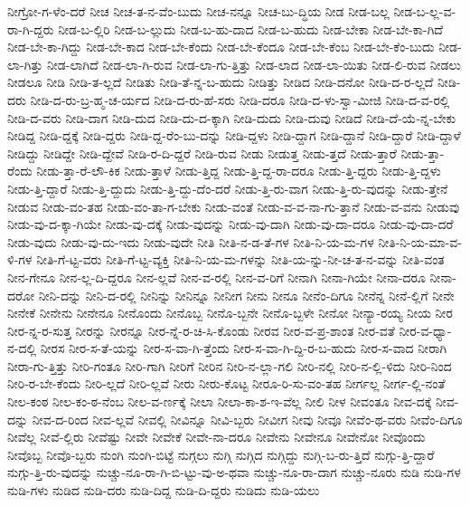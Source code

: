 {ನೀಗ್ರೋ-ಗ-ಳೆಂ-ದರೆ
ನೀಚ
ನೀಚ-ತ-ನ-ವೆಂ-ಬುದು
ನೀಚ-ನನ್ನೂ
ನೀಚ-ಬು-ದ್ಧಿಯ
ನೀಡ
ನೀಡ-ಬಲ್ಲ
ನೀಡ-ಬ-ಲ್ಲ-ವ-ರಾ-ಗಿ-ದ್ದರು
ನೀಡ-ಬ-ಲ್ಲಿರಿ
ನೀಡ-ಬ-ಲ್ಲುದು
ನೀಡ-ಬ-ಹು-ದಾದ
ನೀಡ-ಬ-ಹುದು
ನೀಡ-ಬೇಕಾ
ನೀಡ-ಬೇ-ಕಾ-ಗಿದೆ
ನೀಡ-ಬೇ-ಕಾ-ಗಿದ್ದು
ನೀಡ-ಬೇ-ಕಾದ
ನೀಡ-ಬೇ-ಕೆಂದು
ನೀಡ-ಬೇ-ಕೆಂದೂ
ನೀಡ-ಬೇ-ಕೆಂಬ
ನೀಡ-ಬೇ-ಕೆಂ-ಬುದು
ನೀಡ-ಲಾ-ಗಿತ್ತು
ನೀಡ-ಲಾಗಿದೆ
ನೀಡ-ಲಾ-ಗಿ-ರುವ
ನೀಡ-ಲಾ-ಗು-ತ್ತಿತ್ತು
ನೀಡ-ಲಾದ
ನೀಡ-ಲಾ-ಯಿತು
ನೀಡ-ಲಿ-ರುವ
ನೀಡಲು
ನೀಡಲೂ
ನೀಡಿ
ನೀಡಿ-ತ-ಲ್ಲದೆ
ನೀಡಿತು
ನೀಡಿ-ತೆ-ನ್ನ-ಬ-ಹುದು
ನೀಡಿತ್ತು
ನೀಡಿದ
ನೀಡಿ-ದನೋ
ನೀಡಿ-ದ-ರ-ಲ್ಲದೆ
ನೀಡಿ-ದರು
ನೀಡಿ-ದ-ರು-ಬ್ರ-ಹ್ಮ-ಚ-ರ್ಯದ
ನೀಡಿ-ದ-ರು-ಹೆ-ಸರು
ನೀಡಿ-ದರೂ
ನೀಡಿ-ದ-ಳು-ಸ್ವಾ-ಮೀಜಿ
ನೀಡಿ-ದ-ವ-ರಲ್ಲಿ
ನೀಡಿ-ದ-ವರು
ನೀಡಿ-ದಾಗ
ನೀಡಿ-ದುದ
ನೀಡಿ-ದು-ದ-ಕ್ಕಾಗಿ
ನೀಡಿ-ದುದು
ನೀಡಿ-ದುವು
ನೀಡಿದೆ
ನೀಡಿ-ದೆ-ಯೆ-ನ್ನ-ಬೇಕು
ನೀಡಿದ್ದ
ನೀಡಿ-ದ್ದಕ್ಕೆ
ನೀಡಿ-ದ್ದರು
ನೀಡಿ-ದ್ದ-ರೆಂ-ಬು-ದನ್ನು
ನೀಡಿ-ದ್ದಳು
ನೀಡಿ-ದ್ದಾಗ
ನೀಡಿ-ದ್ದಾನೆ
ನೀಡಿ-ದ್ದಾರೆ
ನೀಡಿ-ದ್ದಾಳೆ
ನೀಡಿದ್ದು
ನೀಡಿದ್ದೇ
ನೀಡಿ-ದ್ದೇವೆ
ನೀಡಿ-ರ-ದಿ-ದ್ದರೆ
ನೀಡಿ-ರುವ
ನೀಡು
ನೀಡುತ್ತ
ನೀಡು-ತ್ತದೆ
ನೀಡು-ತ್ತಾರೆ
ನೀಡು-ತ್ತಾ-ರೆಂದು
ನೀಡು-ತ್ತಾ-ರೆ-ಲೌ-ಕಿಕ
ನೀಡು-ತ್ತಾಳೆ
ನೀಡು-ತ್ತಿದ್ದ
ನೀಡು-ತ್ತಿ-ದ್ದ-ರಾ-ದರೂ
ನೀಡು-ತ್ತಿ-ದ್ದರು
ನೀಡು-ತ್ತಿ-ದ್ದಳು
ನೀಡು-ತ್ತಿ-ದ್ದಾರೆ
ನೀಡು-ತ್ತಿ-ದ್ದುದು
ನೀಡು-ತ್ತಿ-ದ್ದು-ದೆಂ-ದರೆ
ನೀಡು-ತ್ತಿ-ರು-ವಾಗ
ನೀಡು-ತ್ತಿ-ರು-ವುದನ್ನು
ನೀಡು-ತ್ತೇನೆ
ನೀಡುವ
ನೀಡು-ವಂ-ತಹ
ನೀಡು-ವಂ-ತಾ-ಗ-ಬೇಕು
ನೀಡು-ವಂತೆ
ನೀಡು-ವ-ವ-ನಾ-ಗು-ತ್ತಾನೆ
ನೀಡು-ವ-ವನು
ನೀಡುವು
ನೀಡು-ವು-ದ-ಕ್ಕಾ-ಗಿಯೇ
ನೀಡು-ವು-ದಕ್ಕೆ
ನೀಡು-ವುದನ್ನು
ನೀಡು-ವು-ದಾಗಿ
ನೀಡು-ವು-ದಾ-ದರೂ
ನೀಡು-ವು-ದಾ-ದರೆ
ನೀಡು-ವುದು
ನೀಡು-ವು-ದು-ಇದು
ನೀಡು-ವುದೇ
ನೀತಿ
ನೀತಿ-ನ-ಡ-ತೆ-ಗಳ
ನೀತಿ-ನಿ-ಯ-ಮ-ಗಳ
ನೀತಿ-ನಿ-ಯ-ಮಾ-ವ-ಳಿ-ಗಳ
ನೀತಿ-ಗೆ-ಟ್ಟ-ವರು
ನೀತಿ-ಗೆ-ಟ್ಟ-ವ್ಯಕ್ತಿ
ನೀತಿ-ನಿ-ಯ-ಮ-ಗಳನ್ನು
ನೀತಿ-ಯ-ನ್ನು-ನೀ-ಚ-ತ-ನ-ವನ್ನು
ನೀತಿ-ವಂತ
ನೀನ-ಗೇನೂ
ನೀನ-ಲ್ಲ-ದಿ-ದ್ದರೂ
ನೀನ-ಲ್ಲವೆ
ನೀನ-ವ-ರಲ್ಲಿ
ನೀನ-ವ-ರಿಗೆ
ನೀನಾಗಿ
ನೀನಾ-ಗಿಯೇ
ನೀನಾ-ದರೂ
ನೀನಾ-ದರೋ
ನೀನಿ-ದನ್ನು
ನೀನಿ-ದ-ರಲ್ಲಿ
ನೀನಿನ್ನು
ನೀನಿನ್ನೂ
ನೀನೀಗ
ನೀನು
ನೀನೂ
ನೀನೆಂ-ದಿಗೂ
ನೀನೆನ್ನ
ನೀನೆ-ಲ್ಲಿಗೆ
ನೀನೇ
ನೀನೇಕೆ
ನೀನೇನು
ನೀನೇನೂ
ನೀನೊಂದು
ನೀನೊಬ್ಬ
ನೀನೊ-ಬ್ಬನೇ
ನೀನೊ-ಬ್ಬಳೇ
ನೀನೋ
ನೀನ್ಯಾ-ರಯ್ಯ
ನೀಯ
ನೀರ
ನೀರ-ನ್ನ-ರ-ಸುತ್ತ
ನೀರನ್ನು
ನೀರನ್ನೂ
ನೀರ-ನ್ನೆ-ರ-ಚಿ-ಸಿ-ಕೊಂಡು
ನೀರವ
ನೀರ-ವ-ಪ್ರ-ಶಾಂತ
ನೀರ-ವತೆ
ನೀರ-ವ-ಧ್ಯಾ-ನ-ದಲ್ಲಿ
ನೀರಸ
ನೀರ-ಸ-ತೆ-ಯನ್ನು
ನೀರ-ಸ-ವಾ-ಗಿ-ತ್ತೆಂದು
ನೀರ-ಸ-ವಾ-ಗಿ-ದ್ದಿ-ರ-ಬ-ಹುದು
ನೀರ-ಸ-ವಾದ
ನೀರಾಗಿ
ನೀರಾ-ಗು-ತ್ತಿತ್ತು
ನೀರಿ-ಗಂತೂ
ನೀರಿ-ಗಾಗಿ
ನೀರಿಗೆ
ನೀರಿನ
ನೀರಿ-ನ-ಲ್ಲಾ-ಗಲಿ
ನೀರಿ-ನಲ್ಲಿ
ನೀರಿ-ನ-ಲ್ಲಿ-ಳಿದು
ನೀರಿ-ನಿಂದ
ನೀರಿ-ರ-ಬೇ-ಕೆಂದು
ನೀರಿ-ಲ್ಲದೆ
ನೀರಿ-ಲ್ಲವೆ
ನೀರು
ನೀರು-ಕೊಟ್ಟ
ನೀರೂ-ರಿ-ಸು-ವಂ-ತಹ
ನೀರ್ಗಲ್ಲ
ನೀರ್ಗ-ಲ್ಲಿ-ನಂತೆ
ನೀಲ-ಕಂಠ
ನೀಲ-ಕಂ-ಠ-ನೆಂಬ
ನೀಲ-ವ-ರ್ಣಕ್ಕೆ
ನೀಲಾ
ನೀಲಾ-ಕಾ-ಶ-ಇ-ವೆಲ್ಲ
ನೀಲಿ
ನೀಳ
ನೀವಂತೂ
ನೀವ-ದಕ್ಕೆ
ನೀವ-ದನ್ನು
ನೀವ-ದ-ರಿಂದ
ನೀವ-ಲ್ಲವೆ
ನೀವಲ್ಲಿ
ನೀವಿನ್ನೂ
ನೀವಿ-ಬ್ಬರು
ನೀವೀಗ
ನೀವು
ನೀವೂ
ನೀವೆಂ-ಥ-ವರು
ನೀವೆಂ-ದಿಗೂ
ನೀವೆಲ್ಲ
ನೀವೆ-ಲ್ಲಿರು
ನೀವೆಷ್ಟು
ನೀವೇ
ನೀವೇಕೆ
ನೀವೇ-ನಾ-ದರೂ
ನೀವೇನು
ನೀವೇನೂ
ನೀವೇನೋ
ನೀವೊಂದು
ನೀವೊಬ್ಬ
ನೀವೊ-ಬ್ಬರು
ನುಂಗಿ
ನುಂಗಿ-ಬಿಟ್ಟೆ
ನುಗ್ಗಲು
ನುಗ್ಗಿ
ನುಗ್ಗಿದ
ನುಗ್ಗಿದ್ದು
ನುಗ್ಗಿ-ಬ-ರು-ತ್ತಿದೆ
ನುಗ್ಗು-ತ್ತಿ-ದ್ದಾರೆ
ನುಗ್ಗು-ತ್ತಿ-ರು-ವುದನ್ನು
ನುಚ್ಚು-ನೂ-ರಾ-ಗಿ-ಬಿ-ಟ್ಟು-ವು-ಅ-ಥವಾ
ನುಚ್ಚು-ನೂ-ರಾ-ದಾಗ
ನುಚ್ಚು-ನೂರು
ನುಡಿ
ನುಡಿ-ಗಳ
ನುಡಿ-ಗಳು
ನುಡಿದ
ನುಡಿ-ದರು
ನುಡಿ-ದಿದ್ದ
ನುಡಿ-ದಿ-ದ್ದರು
ನುಡಿದು
ನುಡಿ-ಯಲು
}
